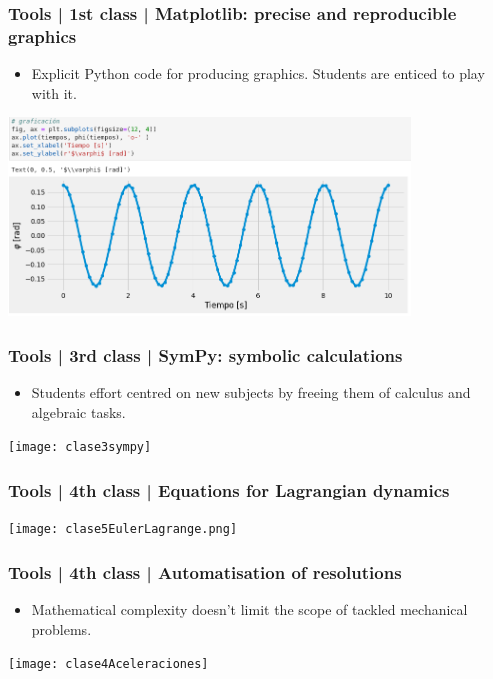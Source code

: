 \documentclass[aspectratio=169]{beamer}
\begin{document}
\begin{frame}
	\frametitle{Tools | 1st class | Matplotlib: precise and reproducible graphics}
	\begin{block}{}
		\begin{itemize}
			\item Explicit Python code for producing graphics. Students are enticed to play with it.
		\end{itemize}
	\includegraphics[width= 0.8\textwidth]{clase1gráficos}
	\end{block}
\end{frame}


\begin{frame}
	\frametitle{Tools | 3rd class | SymPy: symbolic calculations}
	\begin{block}{}
		\begin{itemize}
			\item Students effort centred on new subjects by freeing them  of calculus and algebraic tasks.
		\end{itemize}
	\texttt{[image: clase3sympy]}
	\end{block}
\end{frame}


\begin{frame}
	\frametitle{Tools | 4th class | Equations for Lagrangian dynamics}
	\begin{block}{}
	\texttt{[image: clase5EulerLagrange.png]}
	\end{block}
\end{frame}


\begin{frame}
	\frametitle{Tools | 4th class | Automatisation of resolutions}
	\begin{block}{}
		\begin{itemize}
			\item Mathematical complexity doesn't limit the scope of tackled mechanical problems.
		\end{itemize}
	\texttt{[image: clase4Aceleraciones]}
	\end{block}
\end{frame}
\end{document}
